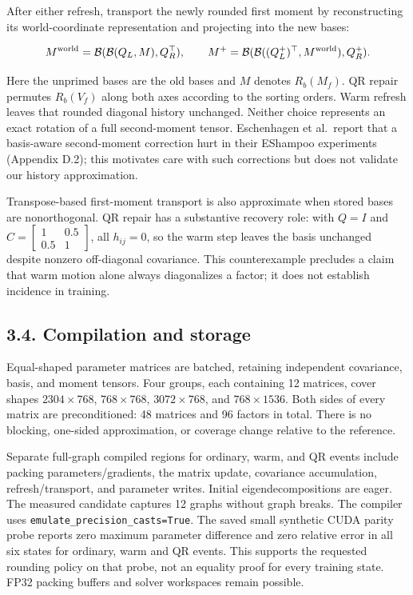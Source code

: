 \documentclass[
  10pt,
]{article}
\begin{document}
After either refresh, transport the newly rounded first moment by
reconstructing its world-coordinate representation and projecting into
the new bases:

\[
M^{\rm world}=\mathcal B(\mathcal B(Q_L,M),Q_R^\top),\qquad
M^+=\mathcal B(\mathcal B((Q_L^+)^\top,M^{\rm world}),Q_R^+).
\]

Here the unprimed bases are the old bases and \(M\) denotes
\(R_b(M_f)\). QR repair permutes \(R_b(V_f)\) along both axes according
to the sorting orders. Warm refresh leaves that rounded diagonal history
unchanged. Neither choice represents an exact rotation of a full
second-moment tensor. Eschenhagen et al.~report that a basis-aware
second-moment correction hurt in their EShampoo experiments (Appendix
D.2); this motivates care with such corrections but does not validate
our history approximation.

Transpose-based first-moment transport is also approximate when stored
bases are nonorthogonal. QR repair has a substantive recovery role: with
\(Q=I\) and
\(C=\left[\begin{smallmatrix}1&0.5\\0.5&1\end{smallmatrix}\right]\), all
\(h_{ij}=0\), so the warm step leaves the basis unchanged despite
nonzero off-diagonal covariance. This counterexample precludes a claim
that warm motion alone always diagonalizes a factor; it does not
establish incidence in training.

\hypertarget{compilation-and-storage}{%
\subsection{3.4. Compilation and
storage}\label{compilation-and-storage}}

Equal-shaped parameter matrices are batched, retaining independent
covariance, basis, and moment tensors. Four groups, each containing 12
matrices, cover shapes \(2304\times768\), \(768\times768\),
\(3072\times768\), and \(768\times1536\). Both sides of every matrix are
preconditioned: 48 matrices and 96 factors in total. There is no
blocking, one-sided approximation, or coverage change relative to the
reference.

Separate full-graph compiled regions for ordinary, warm, and QR events
include packing parameters/gradients, the matrix update, covariance
accumulation, refresh/transport, and parameter writes. Initial
eigendecompositions are eager. The measured candidate captures 12 graphs
without graph breaks. The compiler uses
\texttt{emulate\_precision\_casts=True}. The saved small synthetic CUDA
parity probe reports zero maximum parameter difference and zero relative
error in all six states for ordinary, warm and QR events. This supports
the requested rounding policy on that probe, not an equality proof for
every training state. FP32 packing buffers and solver workspaces remain
possible.
\end{document}
